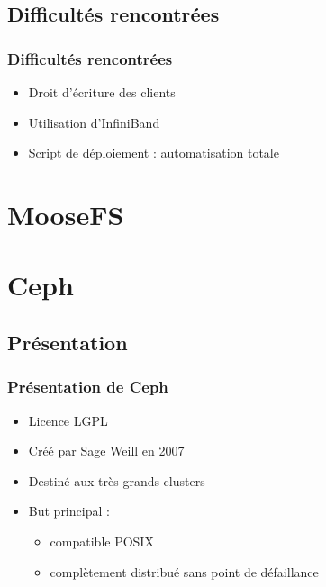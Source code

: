 \documentclass[blue]{beamer}
\begin{document}
	\subsection{Difficultés rencontrées}
	\begin{frame}
		\frametitle{Difficultés rencontrées}
			\begin{itemize}
				\item Droit d'écriture des clients
				\item Utilisation d'InfiniBand
				\item Script de déploiement : automatisation totale
			\end{itemize}
	\end{frame}


\section{MooseFS}
\begin{frame}

\end{frame}

\section{Ceph}
        \subsection{Présentation}
        \begin{frame}
                \frametitle{Présentation de Ceph}
		\begin{itemize}
			\item Licence LGPL
			\item Créé par Sage Weill en 2007
			\item Destiné aux très grands clusters
			\item But principal : 
                              \begin{itemize}
                                      \item compatible POSIX
                                      \item complètement distribué sans point de défaillance
                              \end{itemize}
		\end{itemize}
        \end{frame}
\end{document}
